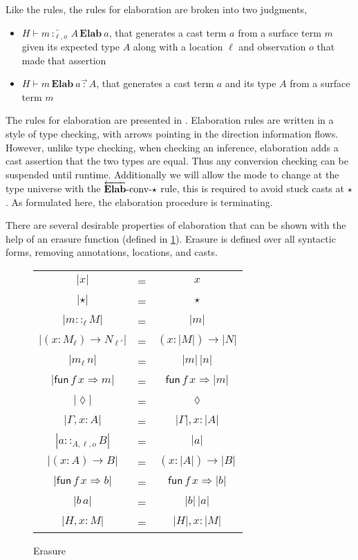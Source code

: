 Like the \bidir{} rules, the rules for elaboration are broken into two judgments,
\begin{itemize}
\item $H\vdash m\overleftarrow{\,:_{\ell,o}\,}A\,\textbf{Elab}\ a$, that generates a cast term $a$ from a surface term $m$ given its expected type $A$ along with a location $\ell$ and observation $o$ that made that assertion
\item $H\vdash m\,\textbf{Elab}\ a\overrightarrow{\,:\,}A$, that generates a cast term $a$ and its type $A$ from a surface term $m$
\end{itemize}
The rules for elaboration are presented in .
Elaboration rules are written in a style of \bidir{} type checking, with arrows pointing in the direction information flows.
However, unlike \bidir{} type checking, when checking an inference, elaboration adds a cast assertion that the two types are equal.
Thus any conversion checking can be suspended until runtime.
Additionally we will allow the mode to change at the type universe with the $\operatorname{\overleftarrow{\textbf{Elab}}-conv-\star}$ rule, this is required to avoid stuck casts at $\star$.
As formulated here, the elaboration procedure is terminating.

There are several desirable properties of elaboration that can be shown with the help of an erasure function (defined in \ref{fig:erasure}).
Erasure is defined over all syntactic forms, removing annotations, locations, and casts.

\begin{figure}
\begin{tabular}{ccc}
$|x|$ & = & $x$\tabularnewline
$|\star|$ & = & $\star$\tabularnewline
$|m::_{\ell}M|$ & = & $|m|$\tabularnewline
$|\left(x:M_{\ell}\right)\rightarrow N_{\ell'}|$ & = & $\left(x:|M|\right)\rightarrow|N|$\tabularnewline
$|m_{\ell}\,n|$ & = & $|m|\,|n|$\tabularnewline
$|\mathsf{fun}\,f\,x\Rightarrow m|$ & = & $\mathsf{fun}\,f\,x\Rightarrow|m|$\tabularnewline
$|\lozenge|$ & = & $\lozenge$\tabularnewline
$|\Gamma,x:A|$ & = & $|\Gamma|,x:|A|$\tabularnewline
$|a::_{A,\ell,o}B|$ & = & $|a|$\tabularnewline
$|\left(x:A\right)\rightarrow B|$ & = & $\left(x:|A|\right)\rightarrow|B|$\tabularnewline
$|\mathsf{fun}\,f\,x\Rightarrow b|$ & = & $\mathsf{fun}\,f\,x\Rightarrow|b|$\tabularnewline
$|b\,a|$ & = & $|b|\,|a|$\tabularnewline
$|H,x:M|$ & = & $|H|,x:|M|$\tabularnewline
\end{tabular}
\caption{Erasure}
\label{fig:erasure}
\end{figure}

